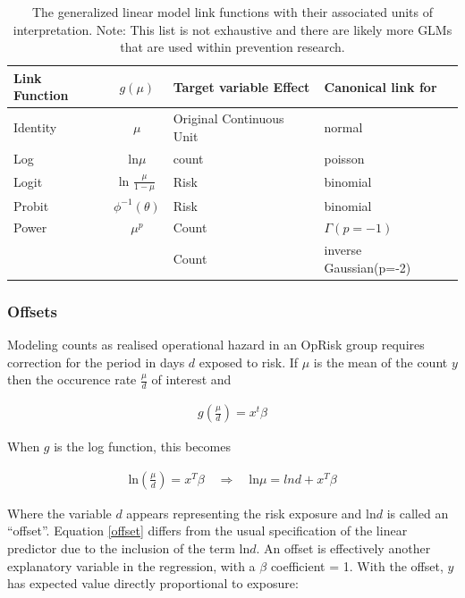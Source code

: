 \documentclass{DissertateUSU}
\begin{document}
\begin{table}[tb]
\centering
\caption{The generalized linear model link functions with their associated units of interpretation. Note: This list is not exhaustive and there are likely more GLMs that are used within prevention research.} 
\label{tab_linkfcn}
\begin{tabular}{lcll}
\toprule
Link Function & $g(\mu)$ & Target variable Effect & Canonical link for \\ 
\midrule
Identity & $\mu$ & Original Continuous Unit & normal \\ 
  Log & ln$\mu$ & count & poisson \\ 
  Logit & ln $\frac{\mu}{1-\mu}$ & Risk & binomial \\ 
  Probit & $\phi^{-1}(\theta)$ & Risk & binomial \\ 
  Power & $\mu^p$ & Count & $\Gamma(p=-1)$\\
        &       & Count & inverse Gaussian(p=-2)\\
\bottomrule
\end{tabular}
\end{table}

\subsubsection{Offsets}

Modeling counts as realised operational hazard in an OpRisk group
requires correction for the period in days \(d\) exposed to risk. If
\(\mu\) is the mean of the count \(y\) then the occurence rate
\(\frac{\mu}{d}\) of interest and

\singlespacing

\begin{eqnarray}
g\left(\frac{\mu}{d}\right) = x^t\beta
\end{eqnarray} \doublespacing

When \(g\) is the log function, this becomes

\singlespacing

\begin{eqnarray}\label{offset}
\mbox{ln}\left(\frac{\mu}{d}\right) = x^T\beta \quad \Rightarrow \quad \mbox{ln}\mu = ln d + x^T\beta
\end{eqnarray} \doublespacing

Where the variable \(d\) appears representing the risk exposure and
ln\(d\) is called an ``offset''. Equation \ref{offset} differs from the
usual specification of the linear predictor due to the inclusion of the
term ln\(d\). An offset is effectively another explanatory variable in
the regression, with a \(\beta\) coefficient = 1. With the offset, \(y\)
has expected value directly proportional to exposure:
\end{document}
